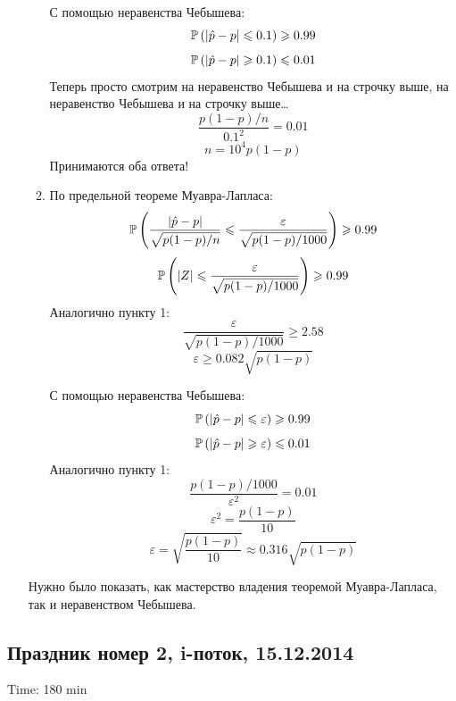 \documentclass[12pt, a4paper]{article}\usepackage[]{graphicx}\usepackage[]{color}
\begin{document}
\begin{enumerate}
\begin{enumerate}
С помощью неравенства Чебышева:
\[ \P \left( |\hat{p} - p| \leqslant 0.1 \right) \geqslant 0.99 \]
\[ \P \left( |\hat{p} - p| \geqslant 0.1 \right) \leqslant 0.01 \]
Теперь просто смотрим на неравенство Чебышева и на строчку выше, на неравенство Чебышева и на строчку выше\ldots
\[ \frac{p(1-p)/n}{0.1^2} = 0.01\]
\[ n = 10^4 p(1-p) \]
Принимаются оба ответа!

\item По предельной теореме Муавра-Лапласа:
\[ \P \left( \frac{|\hat{p} - p|}{\sqrt{p(1-p)/n}} \leqslant \frac{\varepsilon}{\sqrt{p(1-p)/1000}} \right) \geqslant 0.99 \]
\[ \P \left( |Z| \leqslant \frac{\varepsilon}{\sqrt{p(1-p)/1000}} \right) \geqslant 0.99 \]
Аналогично пункту 1:
\[ \frac{\varepsilon}{\sqrt{p(1-p)/1000}} \geqslant 2.58 \]
\[ \varepsilon \geqslant 0.082 \sqrt{p(1-p)} \]

С помощью неравенства Чебышева:
\[ \P \left( |\hat{p} - p| \leqslant \varepsilon \right) \geqslant 0.99 \]
\[ \P \left( |\hat{p} - p| \geqslant \varepsilon \right) \leqslant 0.01 \]
Аналогично пункту 1:
\[ \frac{p(1-p)/1000}{\varepsilon^2} = 0.01\]
\[ \varepsilon^2 = \frac{p(1-p)}{10} \]
\[ \varepsilon = \sqrt{\frac{p(1-p)}{10}} \approx 0.316 \sqrt{p(1-p)} \]

\end{enumerate}

Нужно было показать, как мастерство владения теоремой Муавра-Лапласа, так и неравенством Чебышева.


\end{enumerate}


\subsection{Праздник номер 2, i-поток, 15.12.2014}

Time: 180 min
\end{document}
